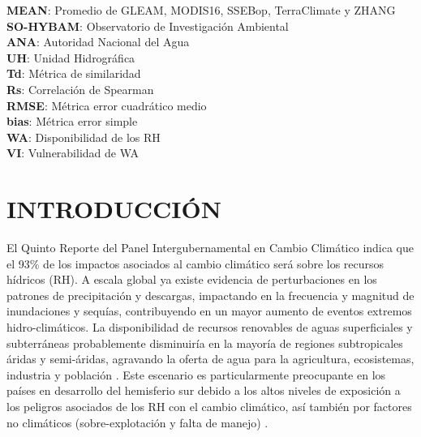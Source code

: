 \documentclass[12pt]{article}
\begin{document}
\textbf{MEAN}: Promedio de GLEAM, MODIS16, SSEBop, TerraClimate y ZHANG \\
\textbf{SO-HYBAM}: Observatorio de Investigación Ambiental \\
\textbf{ANA}: Autoridad Nacional del Agua \\
\textbf{UH}: Unidad Hidrográfica \\
\textbf{Td}: Métrica de similaridad \\
\textbf{Rs}: Correlación de Spearman \\
\textbf{RMSE}: Métrica error cuadrático medio \\
\textbf{bias}: Métrica error simple \\
\textbf{WA}: Disponibilidad de los RH \\
\textbf{VI}: Vulnerabilidad de WA \\

\clearpage




\clearpage
\vspace*{0.5mm}
\section{INTRODUCCIÓN}

El Quinto Reporte del Panel Intergubernamental en Cambio Climático \citep[IPCC;][]{Field2014} indica que el 93\% de los impactos asociados al cambio climático será sobre los recursos hídricos (RH). A escala global ya existe evidencia de perturbaciones en los patrones de precipitación y descargas, impactando en la frecuencia y magnitud de inundaciones y sequías, contribuyendo en un mayor aumento de eventos extremos hidro-climáticos. La disponibilidad de recursos renovables de aguas superficiales y subterráneas probablemente disminuiría en la mayoría de regiones subtropicales áridas y semi-áridas, agravando la oferta de agua para la agricultura, ecosistemas, industria y población \citep{Field2014}. Este escenario es particularmente preocupante en los países en desarrollo del hemisferio sur \citep{Satterthwaite2012} debido a los altos niveles de exposición a los peligros asociados de los RH con el cambio climático, así también por factores no climáticos (sobre-explotación y falta de manejo) \citep{MacAlister2018}.
\end{document}
